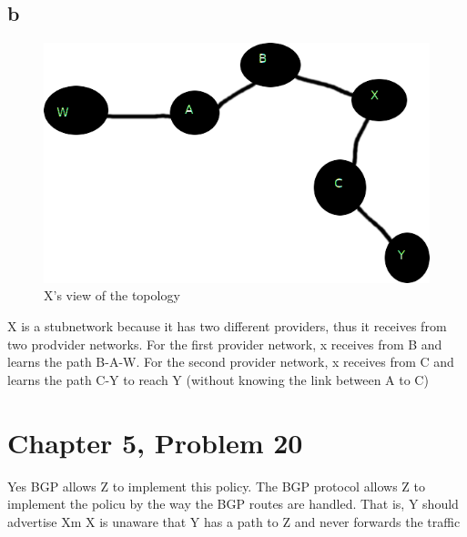 \documentclass{article}
\begin{document}
\subsection*{b}
\begin{figure}[h!]
\centering
\includegraphics[scale=0.5]{Q17b.png}
\caption{X's view of the topology}
\end{figure}
X is a stubnetwork because it has two different providers, thus it receives from two prodvider networks.  For the first provider network, x receives from B and learns the path B-A-W.  For the second provider network, x receives from C and learns the path C-Y to reach Y (without knowing the link between A to C)\\

\section*{Chapter 5, Problem 20}
Yes BGP allows Z to ­implement this policy.  The BGP protocol allows Z to implement the policu by the way the BGP routes are handled.  That is, Y should advertise Xm X is unaware that Y has a path to Z and never forwards the traffic\\
\end{document}
